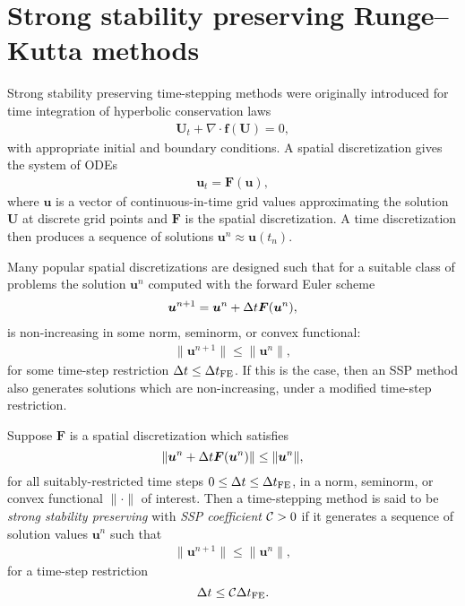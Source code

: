 \section{Strong stability preserving Runge--Kutta methods}
\label{sec:SSP}

Strong stability preserving time-stepping methods were originally introduced
for time integration of hyperbolic conservation laws
\cite{Shu/Osher:1988} 
\begin{align*}
    \bm{U}_t + \nabla \cdot \bm{f}(\bm{U}) = 0,   
\end{align*}
with appropriate initial and boundary conditions.
A spatial discretization gives the system of ODEs
\begin{align*}
    \bm{u}_{t} = \bm{F}(\bm{u}),
\end{align*}
where $\bm{u}$ is a vector of continuous-in-time grid values
approximating the solution $\bm{U}$ at discrete grid points and $\bm{F}$ is
the spatial discretization. %
A time discretization then produces a sequence of solutions
$\bm{u}^{n} \approx \bm{u}(t_n)$.

Many popular spatial discretizations are designed such that for a
suitable class of problems the solution $\bm{u}^{n}$ computed with the
forward Euler scheme
\begin{align}\label{eq:forwardEuler}
    \bm{u}^{n+1} = \bm{u}^{n} + \Delta t\bm{F}(\bm{u}^{n}),
\end{align}
is non-increasing in some norm, seminorm, or convex functional:
\begin{align*}
    \|\bm{u}^{n+1}\| \le \|\bm{u}^n\|,
\end{align*}
for some time-step restriction $\Delta t \leq \Delta t_{\text{FE}}$.
If this is the case, then an SSP method also generates solutions which are non-increasing, under a modified time-step restriction.
\begin{definition}
Suppose $\bm{F}$ is a spatial discretization which satisfies
$$\|\bm{u}^{n} + \Delta t\bm{F}(\bm{u}^{n})\| \le \|\bm{u}^n\|,$$
for all suitably-restricted time steps
$0 \le \Delta t \le \Delta t_{\text{FE}}$,
in a norm, seminorm, or convex functional $\|\cdot\|$ of interest.
Then a time-stepping method is said to be \emph{strong stability
  preserving} with \emph{SSP coefficient} $\mathcal{C} > 0$ if it
generates a sequence of solution values $\bm{u}^n$ such that
\begin{align*}
  \|\bm{u}^{n+1}\| \le \|\bm{u}^n\|,
\end{align*}
for a time-step restriction
$$\Delta t \leq \mathcal{C} \Delta t_{\text{FE}}.$$
\end{definition} 



